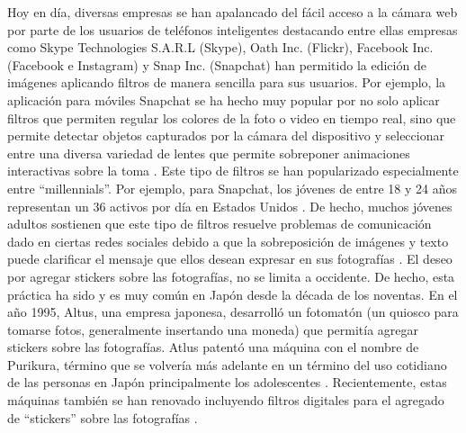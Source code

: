 \documentclass[a4paper,openright,12pt]{report}
\begin{document}
Hoy en día, diversas empresas se han apalancado del fácil acceso a la cámara web
por parte de los usuarios de teléfonos inteligentes destacando entre ellas
empresas como Skype Technologies S.A.R.L (Skype), Oath Inc. (Flickr),
Facebook Inc. (Facebook e Instagram) y Snap Inc. (Snapchat) han permitido la
edición de imágenes aplicando filtros de manera sencilla para sus usuarios. Por
ejemplo, la aplicación para móviles Snapchat se ha hecho muy popular por no solo
aplicar filtros que permiten regular los colores de la foto o video en tiempo
real, sino que permite detectar objetos capturados por la cámara del dispositivo
y seleccionar entre una diversa variedad de lentes que permite sobreponer
animaciones interactivas sobre la toma \cite{snap2017prospectus}⁠. Este tipo de
filtros se han popularizado especialmente entre “millennials”. Por ejemplo, para
Snapchat, los jóvenes de entre 18 y 24 años representan un 36%
activos por día en Estados Unidos \cite{snap2017prospectus}⁠. De hecho, muchos
jóvenes adultos sostienen que este tipo de filtros resuelve problemas de
comunicación dado en ciertas redes sociales debido a que la sobreposición de
imágenes y texto puede clarificar el mensaje que ellos desean expresar en sus
fotografías \cite{vaterlaus2016snapchat}. El deseo por agregar stickers sobre
las fotografías, no se limita a occidente. De hecho, esta práctica ha sido y es
muy común en Japón desde la década de los noventas. En el año 1995, Altus, una
empresa japonesa, desarrolló un fotomatón (un quiosco para tomarse fotos,
generalmente insertando una moneda) que permitía agregar stickers sobre las
fotografías. Atlus patentó una máquina con el nombre de Purikura, término que se
volvería más adelante en un término del uso cotidiano de las personas en Japón
principalmente los adolescentes \cite{edwards2004photographs}. Recientemente,
estas máquinas también se han renovado incluyendo filtros digitales para el
agregado de “stickers” sobre las fotografías \cite{TheOrigi29}.\\
\end{document}
